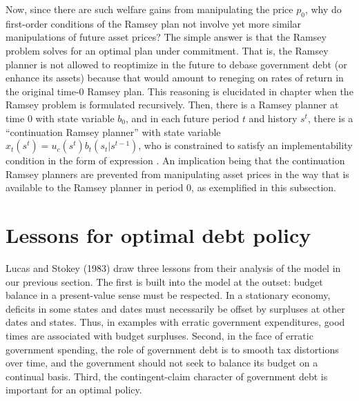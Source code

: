Now, since there are such welfare gains from manipulating the
price $p_0$, why do first-order conditions  of the
Ramsey plan not involve yet more similar manipulations of future
asset prices?
The simple answer is that the Ramsey problem solves for an optimal
plan under commitment. That is, the Ramsey planner is not allowed
to reoptimize in the future to debase government debt (or enhance
its assets) because that would amount to reneging on rates of
return in the original time-$0$ Ramsey plan.
This reasoning is elucidated in
chapter  when the Ramsey problem is formulated
recursively. Then, there is a Ramsey planner at time $0$ with
state variable $b_0$, and in each future period $t$ and history
$s^t$, there is a ``continuation Ramsey planner'' with state
variable $x_t(s^t) = u_c(s^t) b_t(s_t | s^{t-1})$, who is
constrained to satisfy an implementability condition in the form
of expression . An implication being that the
continuation Ramsey planners are prevented from manipulating
asset prices in the way that is available to the Ramsey planner
in period $0$, as exemplified in this subsection.




 
\section{Lessons for optimal debt policy}\label{LS_lessons_debt}
Lucas and Stokey (1983)
draw three lessons from their analysis of the model in our previous section. The
first is built into the model at the outset: budget balance in a present-value
 sense must be respected. In a stationary economy,  deficits in some states and dates must
 necessarily be offset by  surpluses
at other dates and states. Thus, in  examples with erratic government expenditures,
good times are associated with budget surpluses. Second, in the face of
erratic government spending, the role of government debt is to smooth
tax distortions over time, and the government should not seek
to balance its budget on a continual basis. Third, the
contingent-claim character of government debt is important for an
optimal policy.

